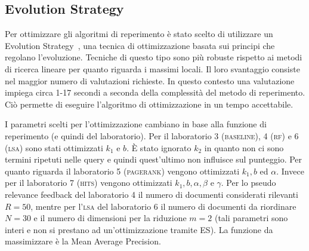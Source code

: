 \subsection{Evolution Strategy}
\label{sec:es}

Per ottimizzare gli algoritmi di reperimento \`e stato scelto di utilizzare un Evolution Strategy~\cite{back1996evolutionary}, una tecnica di ottimizzazione basata sui principi che regolano l'evoluzione. Tecniche di questo tipo sono pi\`u robuste rispetto ai metodi di ricerca lineare per quanto riguarda i massimi locali. Il loro svantaggio consiste nel maggior numero di valutazioni richieste. In questo contesto una valutazione impiega circa 1-17 secondi a seconda della complessit\`a del metodo di reperimento. Ci\`o permette di eseguire l'algoritmo di ottimizzazione in un tempo accettabile.

I parametri scelti per l'ottimizzazione cambiano in base alla funzione di reperimento (e quindi del laboratorio). Per il laboratorio 3 (\textsc{baseline}), 4 (\textsc{rf}) e 6 (\textsc{lsa}) sono stati ottimizzati $k_1$ e $b$. \`E stato ignorato $k_2$ in quanto non ci sono termini ripetuti nelle query e quindi  quest'ultimo non influisce sul punteggio. Per quanto riguarda il laboratorio 5 (\textsc{pagerank}) vengono ottimizzati $k_1, b$ ed $\alpha$. Invece per il laboratorio 7 (\textsc{hits}) vengono ottimizzati $k_1, b, \alpha, \beta$ e $\gamma$. Per lo pseudo relevance feedback del laboratorio 4 il numero di documenti considerati rilevanti $R = 50$, mentre per l'\textsc{lsa} del laboratorio 6 il numero di documenti da riordinare $N = 30$ e il numero di dimensioni per la riduzione $m=2$ (tali parametri sono interi e non si prestano ad un'ottimizzazione tramite ES). La funzione da massimizzare \`e la Mean Average Precision.

